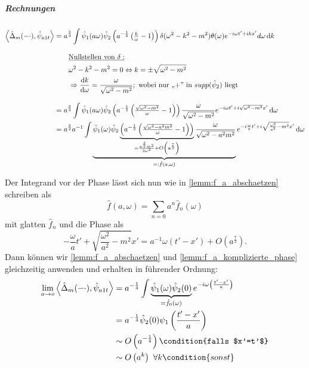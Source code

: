 \subparagraph*{Rechnungen}
\begin{align}
    \left<\hat \Delta_m(-\cdot), \hat \psi_{a1t}\right> &=
        a^{\frac{3}{4}} \int \hat \psi_1(a\omega)
        \hat\psi_2\left(a^{-\frac{1}{2}} \left(\tfrac{k}{\omega}-1\right)\right)
        \delta (\omega^2 - k^2 - m^2) \theta(\omega)
        e^{-i\omega t' + ikx'} d \omega \mathop{}\!\mathrm{d} k \nonumber \\[2ex]
        & \kern 2em \underline{\textrm{Nullstellen von $\delta$}:}
        \nonumber \\
        & \kern 2em \omega^2 - k^2 - m^2 = 0 \Leftrightarrow k = \pm \sqrt{\omega^2-m^2}
        \nonumber \\
        & \kern 2em \Rightarrow \frac{\mathop{}\!\mathrm{d} k}{\mathop{}\!\mathrm{d} \omega} = \frac{\omega}{\sqrt{\omega^2-m^2}}; \textrm{   wobei nur ,,+'' in $supp (\hat \psi_2)$ liegt}
        \nonumber \\[2ex]
        &= a^{\frac{3}{4}} \int \hat\psi_1(a \omega)
        \hat\psi_2\left(a^{-\frac{1}{2}} \left(\tfrac{\sqrt{\omega^2-m^2}}{\omega}-1\right)\right)
        \frac{\omega}{\sqrt{\omega^2-m^2}}
        e^{-i\omega t' + i \sqrt{\omega^2-m^2}x'}
        \mathop{}\!\mathrm{d} \omega \nonumber \\
        &= a^{\frac{3}{4}} a^{-1} \int
        \underbrace{\hat\psi_1(\omega)
                \hat\psi_2
                \underbrace{
                \left(
                    a^{-\frac{1}{2}} \left(\tfrac{\sqrt{\omega^2-a^2m^2}}{\omega}-1\right)
                \right)}_{= \frac{a^{\frac{3}{2}}m^2}{2 \omega^2}
                          + O\left(a^{\frac{7}{2}}\right)}
                \frac{\omega}{\sqrt{\omega^2-a^2 m^2}}}_{=: \hat f(a, \omega)}
                e^{-i\frac{\omega}{a} t' + i \sqrt{\frac{\omega^2}{a^2}-m^2}x'}
        \mathop{}\!\mathrm{d} \omega \nonumber
\end{align}

Der Integrand vor der Phase lässt sich nun wie in \cref{lemm:f_a_abschaetzen} schreiben als \[\hat f(a,\omega) = \sum_{n=0} a^n \hat f_n(\omega)\] mit glatten \(\hat f_n\) und die Phase als \[-\frac{\omega}{a}t' + \sqrt{\frac{\omega^2}{a^2} - m^2}x' = a^{-1} \omega (t'-x')  + O\left(a^{\frac{7}{2}}\right).\]
Dann können wir \cref{lemm:f_a_abschaetzen} und \cref{lemm:f_a_komplizierte_phase} gleichzeitig anwenden und erhalten in führender Ordnung:
\begin{align}
\lim_{a \to o}
\left\langle \hat\Delta_m(-\cdot), \hat\psi_{a1t}\right\rangle
&=
a^{-\frac{1}{4}} \int
\underbrace{{\hat \psi_1(\omega) \hat \psi_2 (0)}}_{= \hat f_0 (\omega)}
    e^{-i\omega \left(\frac{t'-x'}{a}\right)} \nonumber
\\ \nonumber &=
a^{-\frac{1}{4}} \hat \psi_2 (0) \psi_1\left(\frac{t'-x'}{a}\right)
\\ \nonumber &\sim
O\left(a^{-\frac{1}{4}}\right) \condition{falls $x'=t'$}
\\ &\sim O
\left(a^k\right) ~ \forall k  \condition{sonst}
\label{eq:delta_m_s=1}
\end{align}

